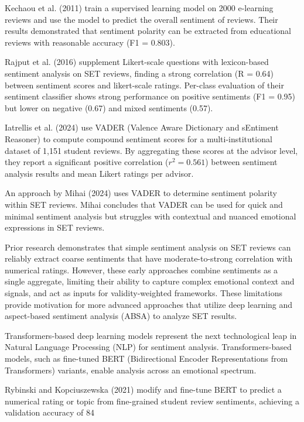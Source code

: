 Kechaou et al. (2011) train a supervised learning model on 2000 e-learning reviews and use the model to predict the overall sentiment of reviews. Their results demonstrated that sentiment polarity can be extracted from educational reviews with reasonable accuracy (F1 = 0.803).

Rajput et al. (2016) supplement Likert-scale questions with lexicon-based sentiment analysis on SET reviews, finding a strong correlation (R = 0.64) between sentiment scores and likert-scale ratings. Per-class evaluation of their sentiment classifier shows strong performance on positive sentiments (F1 = 0.95) but lower on negative (0.67) and mixed sentiments (0.57).

Iatrellis et al. (2024) use VADER (Valence Aware Dictionary and sEntiment Reasoner) to compute compound sentiment scores for a multi-institutional dataset of 1,151 student reviews. By aggregating these scores at the advisor level, they report a significant positive correlation ($r^2 = 0.561$) between sentiment analysis results and mean Likert ratings per advisor.

An approach by Mihai (2024) uses VADER to determine sentiment polarity within SET reviews. Mihai concludes that VADER can be used for quick and minimal sentiment analysis but struggles with contextual and nuanced emotional expressions in SET reviews.
 
Prior research demonstrates that simple sentiment analysis on SET reviews can reliably extract coarse sentiments that have moderate-to-strong correlation with numerical ratings. However, these early approaches combine sentiments as a single aggregate, limiting their ability to capture complex emotional context and signals, and act as inputs for validity-weighted frameworks. These limitations provide motivation for more advanced approaches that utilize deep learning and aspect-based sentiment analysis (ABSA) to analyze SET results.

Transformers-based deep learning models represent the next technological leap in Natural Language Processing (NLP) for sentiment analysis. Transformers-based models, such as fine-tuned BERT (Bidirectional Encoder Representations from Transformers) variants, enable analysis across an emotional spectrum.

Rybinski and Kopciuszewska (2021) modify and fine-tune BERT to predict a numerical rating or topic from fine-grained student review sentiments, achieving a validation accuracy of 84%

